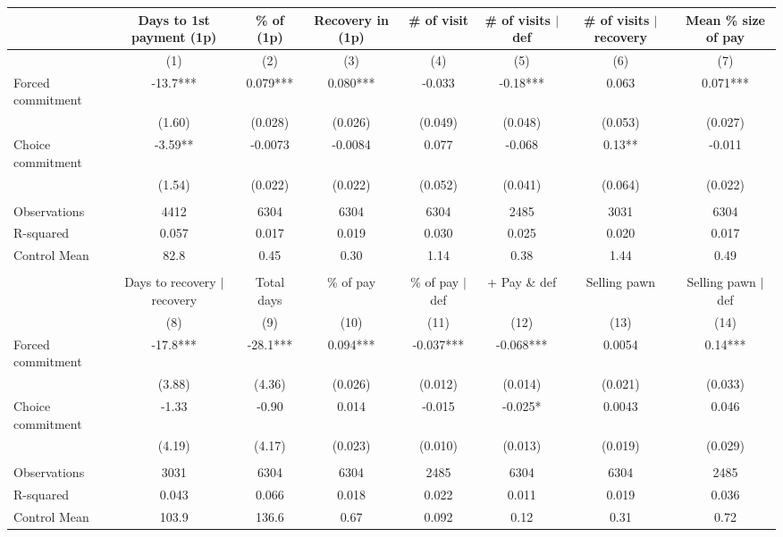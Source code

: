 \begin{tabular}{lccccccc}
\toprule
      & Days to 1st payment (1p) & \% of (1p) & Recovery in (1p) & \# of visit & \# of visits $|$ def & \# of visits $|$ recovery & Mean \% size of pay \\
\midrule
\midrule
      & (1)   & (2)   & (3)   & (4)   & (5)   & (6)   & (7) \\
\midrule
\midrule
Forced commitment & -13.7*** & 0.079*** & 0.080*** & -0.033 & -0.18*** & 0.063 & 0.071*** \\
      & (1.60) & (0.028) & (0.026) & (0.049) & (0.048) & (0.053) & (0.027) \\
Choice commitment & -3.59** & -0.0073 & -0.0084 & 0.077 & -0.068 & 0.13** & -0.011 \\
      & (1.54) & (0.022) & (0.022) & (0.052) & (0.041) & (0.064) & (0.022) \\
      &       &       &       &       &       &       &  \\
\midrule
Observations & 4412  & 6304  & 6304  & 6304  & 2485  & 3031  & 6304 \\
R-squared & 0.057 & 0.017 & 0.019 & 0.030 & 0.025 & 0.020 & 0.017 \\
Control Mean & 82.8  & 0.45  & 0.30  & 1.14  & 0.38  & 1.44  & 0.49 \\
\midrule
\midrule
      &       &       &       &       &       &       &  \\
\midrule
      & Days to recovery $|$ recovery & Total days & \% of pay & \% of pay $|$ def  & + Pay \& def & Selling pawn & Selling pawn $|$ def \\
\midrule
\midrule
      & (8)   & (9)   & (10)  & (11)  & (12)  & (13)  & (14) \\
\midrule
\midrule
Forced commitment & -17.8*** & -28.1*** & 0.094*** & -0.037*** & -0.068*** & 0.0054 & 0.14*** \\
      & (3.88) & (4.36) & (0.026) & (0.012) & (0.014) & (0.021) & (0.033) \\
Choice commitment & -1.33 & -0.90 & 0.014 & -0.015 & -0.025* & 0.0043 & 0.046 \\
      & (4.19) & (4.17) & (0.023) & (0.010) & (0.013) & (0.019) & (0.029) \\
      &       &       &       &       &       &       &  \\
\midrule
Observations & 3031  & 6304  & 6304  & 2485  & 6304  & 6304  & 2485 \\
R-squared & 0.043 & 0.066 & 0.018 & 0.022 & 0.011 & 0.019 & 0.036 \\
Control Mean & 103.9 & 136.6 & 0.67  & 0.092 & 0.12  & 0.31  & 0.72 \\
\bottomrule
\bottomrule
\end{tabular}%
